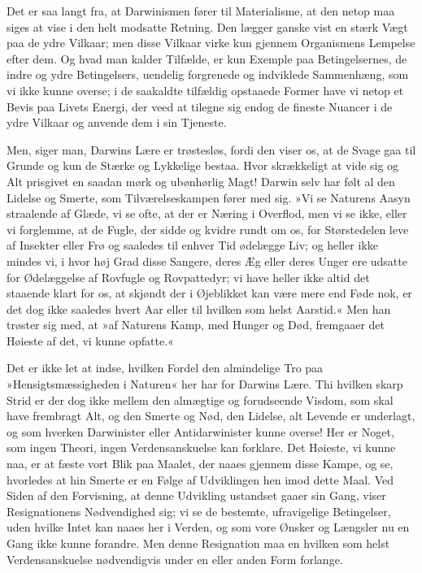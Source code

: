\documentclass[12pt,a4paper]{article}
\begin{document}
Det er saa langt fra, at Darwinismen fører til Materialisme, at den
netop maa siges at vise i den helt modsatte Retning. Den lægger ganske
vist en stærk Vægt paa de ydre Vilkaar; men disse Vilkaar virke kun
gjennem Organismens Lempelse efter dem. Og hvad man kalder Tilfælde, er
kun Exemple paa Betingelsernes, de indre og ydre Betingelsers, uendelig
forgrenede og indviklede Sammenhæng, som vi ikke kunne overse; i de
saakaldte tilfældig opstaaede Former have vi netop et Bevis paa Livets
Energi, der veed at tilegne sig endog de fineste Nuancer i de ydre
Vilkaar og anvende dem i sin Tjeneste.

Men, siger man, Darwins Lære er trøstesløs, fordi den viser os, at de
Svage gaa til Grunde og kun de Stærke og Lykkelige bestaa. Hvor
skrækkeligt at vide sig og Alt prisgivet en saadan mørk og ubønhørlig
Magt! Darwin selv har følt al den Lidelse og Smerte, som
Tilværelseskampen fører med sig. »Vi se Naturens Aasyn straalende af
Glæde, vi se ofte, at der er Næring i Overflod, men vi se ikke, eller vi
forglemme, at de Fugle, der sidde og kvidre rundt om os, for Størstedelen
leve af Insekter eller Frø og saaledes til enhver Tid ødelægge Liv; og
heller ikke mindes vi, i hvor høj Grad disse Sangere, deres Æg eller
deres Unger ere udsatte for Ødelæggelse af Rovfugle og Rovpattedyr; vi
have heller ikke altid det staaende klart for os, at skjøndt der i
Øjeblikket kan være mere end Føde nok, er det dog ikke saaledes hvert
Aar eller til hvilken som helst Aarstid.« Men han trøster sig med, at
»af Naturens Kamp, med Hunger og Død, fremgaaer det Høieste af det, vi
kunne opfatte.«

Det er ikke let at indse, hvilken Fordel den almindelige Tro paa
»Hensigtsmæssigheden i Naturen« her har for Darwins Lære. Thi hvilken
skarp Strid er der dog ikke mellem den almægtige og forudseende Visdom,
som skal have frembragt Alt, og den Smerte og Nød, den Lidelse, alt
Levende er underlagt, og som hverken Darwinister eller Antidarwinister
kunne overse! Her er Noget, som ingen Theori, ingen Verdensanskuelse kan
forklare. Det Høieste, vi kunne naa, er at fæste vort Blik paa Maalet,
der naaes gjennem disse Kampe, og se, hvorledes at hin Smerte er en
Følge af Udviklingen hen imod dette Maal. Ved Siden af den Forvisning,
at denne Udvikling ustandset gaaer sin Gang, viser Resignationens
Nødvendighed sig; vi se de bestemte, ufravigelige Betingelser, uden hvilke
Intet kan naaes her i Verden, og som vore Ønsker og Længsler nu en Gang
ikke kunne forandre. Men denne Resignation maa en hvilken som helst
Verdensanskuelse nødvendigvis under en eller anden Form forlange.
\end{document}
